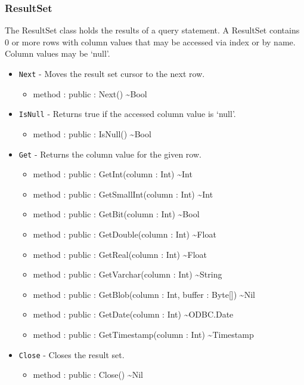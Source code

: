 \documentclass[11pt]{article}
\begin{document}
\subsubsection{ResultSet}
The ResultSet class holds the results of a query statement.  A
ResultSet contains 0 or more rows with column values that may be
accessed via index or by name.  Column values may be `null'.

\begin{itemize}
\item \texttt{Next} - Moves the result set cursor to the next row.
  \begin{itemize}
  \item method : public : Next() \textasciitilde Bool
  \end{itemize}
\item \texttt{IsNull} - Returns true if the accessed column value is `null'.
  \begin{itemize}
  \item method : public : IsNull() \textasciitilde Bool
  \end{itemize}

\item \texttt{Get} - Returns the column value for the given row.
  \begin{itemize}
  \item method : public : GetInt(column : Int) \textasciitilde Int
  \item method : public : GetSmallInt(column : Int) \textasciitilde Int
  \item method : public : GetBit(column : Int) \textasciitilde Bool
  \item method : public : GetDouble(column : Int) \textasciitilde Float
  \item method : public : GetReal(column : Int) \textasciitilde Float
  \item method : public : GetVarchar(column : Int) \textasciitilde String
  \item method : public : GetBlob(column : Int, buffer : Byte[]) \textasciitilde Nil
  \item method : public : GetDate(column : Int) \textasciitilde ODBC.Date
  \item method : public : GetTimestamp(column : Int) \textasciitilde Timestamp 
  \end{itemize}
\item \texttt{Close} - Closes the result set.
  \begin{itemize}
  \item method : public : Close() \textasciitilde Nil
  \end{itemize}
\end{itemize}
\end{document}
